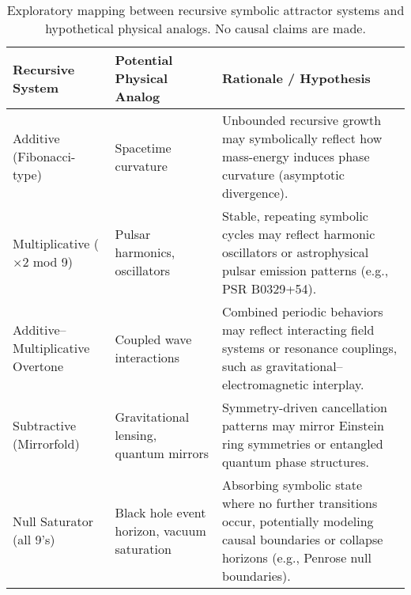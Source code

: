 \documentclass[12pt]{article}
\begin{document}
\begin{table}[h!]
\centering
\renewcommand{\arraystretch}{1.2}
\begin{tabular}{|p{3cm}|p{3.5cm}|p{5cm}|}
\hline
\textbf{Recursive System} & \textbf{Potential Physical Analog} & \textbf{Rationale / Hypothesis} \\
\hline
Additive (Fibonacci-type) & Spacetime curvature & Unbounded recursive growth may symbolically reflect how mass-energy induces phase curvature (asymptotic divergence). \\
\hline
Multiplicative ($\times 2$ mod 9) & Pulsar harmonics, oscillators & Stable, repeating symbolic cycles may reflect harmonic oscillators or astrophysical pulsar emission patterns (e.g., PSR B0329+54). \\
\hline
Additive--Multiplicative Overtone & Coupled wave interactions & Combined periodic behaviors may reflect interacting field systems or resonance couplings, such as gravitational–electromagnetic interplay. \\
\hline
Subtractive (Mirrorfold) & Gravitational lensing, quantum mirrors & Symmetry-driven cancellation patterns may mirror Einstein ring symmetries or entangled quantum phase structures. \\
\hline
Null Saturator (all 9's) & Black hole event horizon, vacuum saturation & Absorbing symbolic state where no further transitions occur, potentially modeling causal boundaries or collapse horizons (e.g., Penrose null boundaries). \\
\hline
\end{tabular}
\caption{Exploratory mapping between recursive symbolic attractor systems and hypothetical physical analogs. No causal claims are made.}
\end{table}
\end{document}
